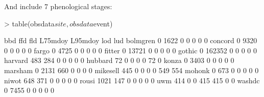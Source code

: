 \documentclass{article}
\begin{document}
And include 7 phenological stages:
\begin{Schunk}
\begin{Sinput}
> table(obsdata$site, obsdata$event)
\end{Sinput}
\begin{Soutput}
              bbd    ffd    fld L75mdoy L95mdoy    lod    lud
  bolmgren      0   1622      0       0       0      0      0
  concord       0   9320      0       0       0      0      0
  fargo         0   4725      0       0       0      0      0
  fitter        0  13721      0       0       0      0      0
  gothic        0 162352      0       0       0      0      0
  harvard     483    284      0       0       0      0      0
  hubbard      72      0      0       0       0     72      0
  konza         0   3403      0       0       0      0      0
  marsham       0   2131    660       0       0      0      0
  mikesell    445      0      0       0       0    549    554
  mohonk        0    673      0       0       0      0      0
  niwot       648    371      0       0       0      0      0
  rousi      1021    147      0       0       0      0      0
  uwm         414      0      0     415     415      0      0
  washdc        0   7455      0       0       0      0      0
\end{Soutput}
\end{Schunk}
\end{document}
